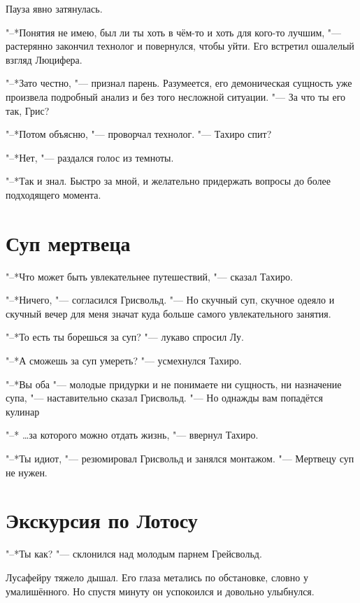 \documentclass[a4paper,10pt]{book}
\newcommand{\mulang}[3]{#2}%
\newcommand{\ldotst}{\so{...}\xspace}
\begin{document}
Пауза явно затянулась.

\mulang{}{"--*Понятия не имею, был ли ты хоть в чём-то и хоть для кого-то лучшим, "--- растерянно закончил технолог и повернулся, чтобы уйти.}
{``I've no idea if you were good at something or for somebody,'' confused Griswold finished, then turned around to leave.}
Его встретил ошалелый взгляд Люцифера.

\mulang{}{"--*Зато честно, "--- признал парень.}
{``You're honest, anyway,'' Lu declared.}
Разумеется, его демоническая сущность уже произвела подробный анализ и без того несложной ситуации.
"--- За что ты его так, Грис?

"--*Потом объясню, "--- проворчал технолог. "--- Тахиро спит?

"--*Нет, "--- раздался голос из темноты.

"--*Так и знал. Быстро за мной, и желательно придержать вопросы до более 
подходящего момента.

\section{Суп мертвеца}

"--*Что может быть увлекательнее путешествий, "--- сказал Тахиро.

"--*Ничего, "--- согласился Грисвольд. "--- Но скучный суп, скучное одеяло и 
скучный вечер для меня значат куда больше самого увлекательного занятия.

"--*То есть ты борешься за суп? "--- лукаво спросил Лу.

"--*А сможешь за суп умереть? "--- усмехнулся Тахиро.

"--*Вы оба "--- молодые придурки и не понимаете ни сущность, ни назначение 
супа, "--- наставительно сказал Грисвольд. "--- Но однажды вам попадётся 
кулинар\ldotst

"--* \dots за которого можно отдать жизнь, "--- ввернул Тахиро.

"--*Ты идиот, "--- резюмировал Грисвольд и занялся монтажом. "--- Мертвецу суп 
не нужен.

\section{Экскурсия по Лотосу}

"--*Ты как? "--- склонился над молодым парнем Грейсвольд.

Лусафейру тяжело дышал. Его глаза метались по обстановке, словно у 
умалишённого. Но спустя минуту он успокоился и довольно улыбнулся.
\end{document}
